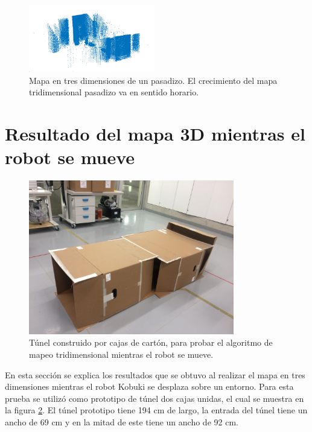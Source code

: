 \begin{figure}
  \includegraphics[width=0.49\textwidth]{images/pasadizo_1.png}
  \captionsetup{font=footnotesize}
  \caption{Mapa en tres dimensiones de un pasadizo. El crecimiento del mapa tridimensional 
  pasadizo va en sentido horario.}
  \label{fig:pasadizo3D}
\end{figure}

\section{Resultado del mapa 3D mientras el robot se mueve}
\begin{figure}
  \centering \footnotesize
  \includegraphics[width=0.80\textwidth]{images/prueba_cajas.JPG}
  \captionsetup{font=footnotesize}
  \caption{Túnel construido por cajas de cartón, para probar el algoritmo
  de mapeo tridimensional mientras el robot se mueve.}
  \label{fig:tunel201}
\end{figure}
En esta sección se explica los resultados que se obtuvo al realizar el mapa en tres
dimensiones mientras el robot Kobuki se desplaza sobre un entorno. Para esta prueba se utilizó 
como prototipo de túnel dos cajas unidas, el cual se muestra en la figura \ref{fig:tunel201}. 
El túnel prototipo tiene 194 cm de largo, la entrada del túnel tiene un ancho de 69 cm y en la 
mitad de este tiene un ancho de 92 cm. 
